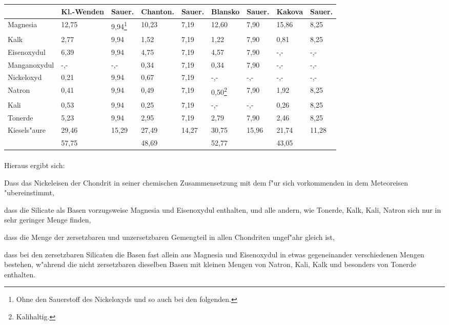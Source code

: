\documentclass[a4paper, 11pt, oneside]{article}
\begin{document}
\begin{center}
\begin{tabular}{ |p{23mm}|p{12mm}|p{9mm}|p{13mm}|p{8mm}|p{11mm}|p{8mm}|p{10mm}|p{8mm}| }
    \hline
     & Kl.-Wenden & Sauer. & Chanton. & Sauer. & Blansko & Sauer. & Kakova & Sauer.\\
    \hline\hline
    Magnesia & 12,75 & 9,94\footnote{Ohne den Sauerstoff des Nickeloxyds und so auch bei den folgenden.} & 10,23 & 7,19 & 12,60 & 7,90 & 15,86 & 8,25\\\hline
    Kalk & 2,77 & 9,94 & 1,52 & 7,19 & 1,22 & 7,90 & 0,81 & 8,25\\\hline
    Eisenoxydul & 6,39 & 9,94 & 4,75 & 7,19 & 4,57 & 7,90 & -,- & -,-\\\hline
    Manganoxydul & -,- & -,- & 0,34 & 7,19 & 0,34 & 7,90 & -,- & -,-\\\hline
    Nickeloxyd & 0,21 & 9,94 & 0,67 & 7,19 & -,- & -,- & -,- & -,-\\\hline
    Natron & 0,41 & 9,94 & 0,49 & 7,19 & 0,50\footnote{Kalihaltig.} & 7,90 & 1,92 & 8,25\\\hline
    Kali & 0,53 & 9,94 & 0,25 & 7,19 & -,- & -,- & 0,26 & 8,25\\\hline
    Tonerde & 5,23 & 9,94 & 2,95 & 7,19 & 2,79 & 7,90 & 2,46 & 8,25\\\hline
    Kiesels"aure & 29,46 & 15,29 & 27,49 & 14,27 & 30,75 & 15,96 & 21,74 & 11,28\\\hline
     & 57,75 & & 48,69 & & 52,77 & & 43,05 & \\
    \hline
\end{tabular}
\end{center}
\vspace{\medskipamount}
\paragraph{}
Hieraus ergibt sich:

Dass das Nickeleisen der Chondrit in seiner chemischen Zusammensetzung mit dem f"ur sich vorkommenden in dem Meteoreisen "ubereinstimmt, 

dass die Silicate als Basen vorzugsweise Magnesia und Eisenoxydul enthalten, und alle andern, wie Tonerde, Kalk, Kali, Natron sich nur in sehr geringer Menge finden,

dass die Menge der zersetzbaren und unzersetzbaren Gemengteil in allen Chondriten ungef"ahr gleich ist,

dass bei den zersetzbaren Silicaten die Basen fast allein aus Magnesia und Eisenoxydul in etwas gegeneinander verschiedenen Mengen bestehen, w"ahrend die nicht zersetzbaren dieselben Basen mit kleinen Mengen von Natron, Kali, Kalk und besonders von Tonerde enthalten.
\end{document}
